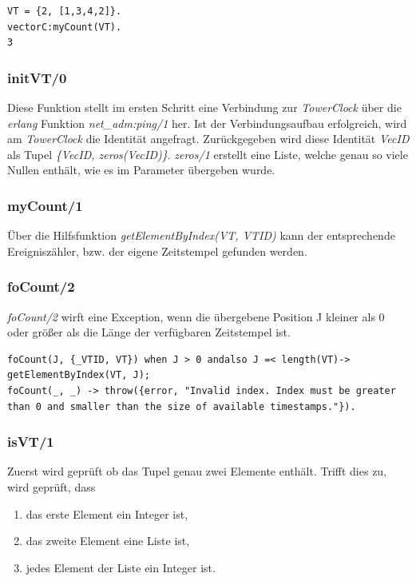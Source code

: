 \begin{lstlisting}
VT = {2, [1,3,4,2]}.
vectorC:myCount(VT).
3
\end{lstlisting}

\subsubsection{initVT/0}

Diese Funktion stellt im ersten Schritt eine Verbindung zur \textit{TowerClock} über die \textit{erlang} Funktion \textit{net\_adm:ping/1} her. Ist der Verbindungsaufbau erfolgreich, wird am \textit{TowerClock} die Identität angefragt. Zurückgegeben wird diese Identität \textit{VecID} als Tupel \textit{\{VecID, zeros(VecID)\}}. \textit{zeros/1} erstellt eine Liste, welche genau so viele Nullen enthält, wie es im Parameter übergeben wurde.

\subsubsection{myCount/1}

Über die Hilfsfunktion \textit{getElementByIndex(VT, VTID)} kann der entsprechende Ereigniszähler, bzw. der eigene Zeitstempel gefunden werden.

\subsubsection{foCount/2}

\textit{foCount/2} wirft eine Exception, wenn die übergebene Position J kleiner als 0 oder größer als die Länge der verfügbaren Zeitstempel ist.

\begin{lstlisting}
foCount(J, {_VTID, VT}) when J > 0 andalso J =< length(VT)-> getElementByIndex(VT, J);
foCount(_, _) -> throw({error, "Invalid index. Index must be greater than 0 and smaller than the size of available timestamps."}).
\end{lstlisting}

\subsubsection{isVT/1}

Zuerst wird geprüft ob das Tupel genau zwei Elemente enthält. Trifft dies zu, wird geprüft, dass
\begin{enumerate}
    \item das erste Element ein Integer ist,
    \item das zweite Element eine Liste ist,
    \item jedes Element der Liste ein Integer ist.
\end{enumerate}

